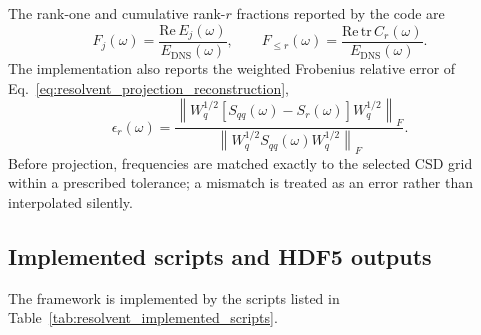 \documentclass[11pt]{article}
\begin{document}
The rank-one and cumulative rank-\(r\) fractions reported by the code are
\begin{equation}
  F_j(\omega)
  =
  \frac{\mathrm{Re}\,E_j(\omega)}
       {E_{\mathrm{DNS}}(\omega)},
  \qquad
  F_{\le r}(\omega)
  =
  \frac{\mathrm{Re}\,\mathrm{tr}\,C_r(\omega)}
       {E_{\mathrm{DNS}}(\omega)}.
  \label{eq:resolvent_projection_fractions}
\end{equation}
The implementation also reports the weighted Frobenius relative error of
Eq.~\eqref{eq:resolvent_projection_reconstruction},
\begin{equation}
  \epsilon_r(\omega)
  =
  \frac{
  \left\|
    W_q^{1/2}\left[S_{qq}(\omega)-S_r(\omega)\right]W_q^{1/2}
  \right\|_F}
  {
  \left\|
    W_q^{1/2}S_{qq}(\omega)W_q^{1/2}
  \right\|_F}.
  \label{eq:resolvent_projection_frobenius_error}
\end{equation}
Before projection, frequencies are matched exactly to the selected CSD grid
within a prescribed tolerance; a mismatch is treated as an error rather than
interpolated silently.

\subsection{Implemented scripts and HDF5 outputs}

The framework is implemented by the scripts listed in
Table~\ref{tab:resolvent_implemented_scripts}.
\end{document}
